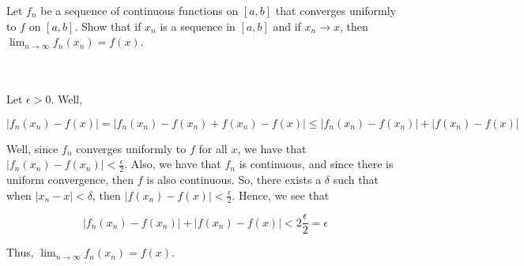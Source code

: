 Let $f_n$ be a sequence of continuous functions on $[a,b]$ that converges uniformly to $f$ on $[a,b]$.
Show that if $x_n$ is a sequence in $[a,b]$ and if $x_n\rightarrow x$, then
$\lim_{n \to \infty} f_n(x_n)=f(x)$.\\\\

\begin{solution}\renewcommand{\qedsymbol}{}\ \\
    Let $\epsilon>0$. Well,
    
    $$|f_n(x_n)-f(x)|=|f_n(x_n)-f(x_n)+f(x_n)-f(x)|\leq|f_n(x_n)-f(x_n)|+|f(x_n)-f(x)|$$
    
    Well, since $f_n$ converges uniformly to $f$ for all $x$, we have that
    $|f_n(x_n)-f(x_n)|<\frac{\epsilon}{2}$. Also, we have that $f_n$ is continuous, and since there is
    uniform convergence, then $f$ is also continuous. So, there exists a $\delta$ such that when
    $|x_n-x|<\delta$, then $|f(x_n)-f(x)|<\frac{\epsilon}{2}$. Hence, we see that
    
    $$|f_n(x_n)-f(x_n)|+|f(x_n)-f(x)|<2\frac{\epsilon}{2}=\epsilon$$
    
    Thus, $\lim_{n \to \infty} f_n(x_n)=f(x)$.

\end{solution}